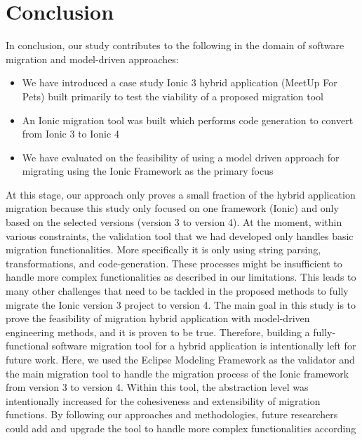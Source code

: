 \documentclass[conference]{IEEEtran}
\begin{document}
\section{Conclusion}
In conclusion, our study contributes to the following in the domain of software migration and model-driven approaches:
\begin{itemize}
    \item We have introduced a case study Ionic 3 hybrid application (MeetUp For Pets) built primarily to test the viability of a proposed migration tool
    \item An Ionic migration tool was built which performs code generation to convert from Ionic 3 to Ionic 4
    \item We have evaluated on the feasibility of using a model driven approach for migrating using the Ionic Framework as the primary focus
\end{itemize}
At this stage, our approach only proves a small fraction of the hybrid application migration because
this study only focused on one framework (Ionic) and only based on the selected versions (version 3 to version 4).
\newline \newline
At the moment, within various constraints, the validation tool that we had developed only handles basic migration functionalities.
More specifically it is only using string parsing, transformations, and code-generation. These processes might
be insufficient to handle more complex functionalities as described in our limitations.
\newline \newline
This leads to many other challenges that need to be tackled in the proposed methods to fully migrate the Ionic version 3 project
to version 4. The main goal in this study is to prove the feasibility of migration hybrid application with model-driven engineering
methods, and it is proven to be true. Therefore, building a fully-functional software migration tool for a hybrid application is intentionally
left for future work.
\newline \newline
Here, we used the Eclipse Modeling Framework as the validator and the main migration tool to handle the migration process of
the Ionic framework from version 3 to version 4. Within this tool, the abstraction level was intentionally
increased for the cohesiveness and extensibility of migration functions. By following our approaches and methodologies,
future researchers could add and upgrade the tool to handle more complex functionalities according
\end{document}
